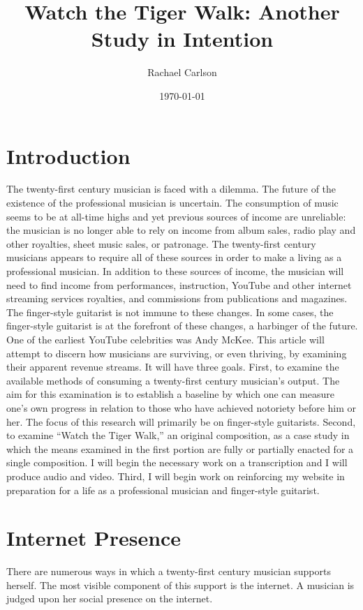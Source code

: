 \documentclass[nofonts,nobib]{tufte-handout}
\title{Watch the Tiger Walk: Another Study in Intention}
\author{Rachael Carlson}
\date{\today}
\begin{document}
\maketitle

\section{Introduction}
The twenty-first century musician is faced with a dilemma. The future
of the existence of the professional musician is uncertain. The
consumption of music seems to be at all-time highs and yet previous
sources of income are unreliable: the musician is no longer able to
rely on income from album sales, radio play and other royalties, sheet
music sales, or patronage. The twenty-first century musicians appears
to require all of these sources in order to make a living as a
professional musician. In addition to these sources of income, the
musician will need to find income from performances, instruction,
YouTube and other internet streaming services royalties,
and commissions from publications and magazines. \\

The finger-style guitarist is not immune to these changes. In some
cases, the finger-style guitarist is at the forefront of these
changes, a harbinger of the future. One of the earliest YouTube
celebrities was Andy McKee. This article will attempt to discern how
musicians are surviving, or even thriving, by examining their apparent
revenue streams. It will have three goals. First, to examine the
available methods of consuming a twenty-first century musician's
output. The aim for this examination is to establish a baseline by
which one can measure one's own progress in relation to those who have
achieved notoriety before him or her. The focus of this research will
primarily be on finger-style guitarists.  Second, to examine ``Watch
the Tiger Walk,'' an original composition, as a case study in which
the means examined in the first portion are fully or partially enacted
for a single composition. I will begin the necessary work on a
transcription and I will produce audio and video.  Third, I will begin
work on reinforcing my website in preparation for a life as a
professional musician and finger-style guitarist.

\section{Internet Presence}
\label{sec:internet-presence}
There are numerous ways in which a twenty-first century musician
supports herself. The most visible component of this support is the
internet. A musician is judged upon her social presence on the
internet.
\end{document}
